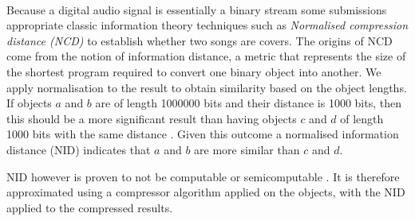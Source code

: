 \paragraph{}
Because a digital audio signal is essentially a binary stream some submissions
appropriate classic information theory techniques such as \textit{Normalised
compression distance (NCD)} to establish whether two songs are covers. The
origins of NCD come from the notion of information distance, a metric that
represents the size of the shortest program required to convert one binary
object into another. We apply normalisation to the result to obtain similarity
based on the object lengths. If objects $a$ and $b$ are of length 1000000 bits
and their distance is 1000 bits, then this should be a more significant result
than having objects $c$ and $d$ of length 1000 bits with the same distance
\cite{wiki:ncd}. Given this outcome a normalised information distance (NID)
indicates that $a$ and $b$ are more similar than $c$ and $d$.

NID however is proven to not be computable or semicomputable
\cite{terwijn2011nonapproximability}. It is therefore approximated using a
compressor algorithm applied on the objects, with the NID applied to the
compressed results.
 